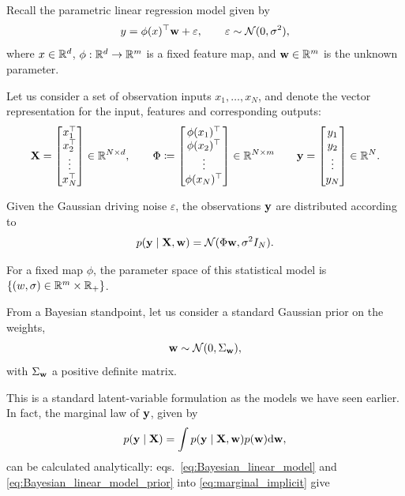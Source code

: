 Recall the parametric linear regression model given by
\[
y = \phi(x)^\top { \mathbf{w}} + \varepsilon,
\qquad
\varepsilon \sim {\mathcal N}(0,\sigma^2),
\]
where $x\in{\mathbb R}^d$, $\phi: {\mathbb R}^d \to{\mathbb R}^m$ is a fixed feature map, and ${ \mathbf{w}}\in{\mathbb R}^m$ is the unknown parameter. 

Let us consider a set of observation inputs $x_1,\ldots,x_N$, and denote the vector representation for the input, features and corresponding outputs: 
\[
{ \mathbf{X}}=\begin{bmatrix}
x_1^\top\\
x_2^\top\\
\vdots\\
x_N^\top
\end{bmatrix} \in{\mathbb R}^{N\times d},
\qquad
\Phi \coloneqq
\begin{bmatrix}
\phi(x_1)^\top\\
\phi(x_2)^\top\\
\vdots\\
\phi(x_N)^\top
\end{bmatrix}\in\mathbb{R}^{N\times m}
\qquad
{ \mathbf{y}}=\begin{bmatrix}
y_1\\
y_2\\
\vdots\\
y_N
\end{bmatrix} \in{\mathbb R}^{N}.
\]

Given the Gaussian driving noise $\varepsilon$, the observations ${ \mathbf{y}}$ are distributed according to 
\begin{equation}
    p({ \mathbf{y}}\mid { \mathbf{X}},{ \mathbf{w}}) = {\mathcal N}(\Phi{ \mathbf{w}},\sigma^2I_N).
    \label{eq:Bayesian_linear_model}
\end{equation}


\begin{remark}
    For a fixed map $\phi$, the parameter space of this statistical model is $\{(w,\sigma) \in{\mathbb R}^m\times{\mathbb R}_+\}$.
\end{remark}


From a Bayesian standpoint, let us consider a standard Gaussian prior on the weights,
\begin{equation}
{ \mathbf{w}} \sim \mathcal{N}(0,\Sigma_{ \mathbf{w}}),
 \label{eq:Bayesian_linear_model_prior}
\end{equation}
with $\Sigma_{ \mathbf{w}}$ a positive definite matrix.

This is a standard latent-variable formulation as the models we have seen earlier. In fact, the marginal law of ${ \mathbf{y}}$, given by 
\begin{equation}
    p({ \mathbf{y}} \mid { \mathbf{X}}) = \int  p({ \mathbf{y}} \mid { \mathbf{X}}, { \mathbf{w}})p({ \mathbf{w}}){\text{d}}{ \mathbf{w}},
    \label{eq:marginal_implicit}
\end{equation}
can be calculated analytically: eqs.~\eqref{eq:Bayesian_linear_model} and  \eqref{eq:Bayesian_linear_model_prior} into  \eqref{eq:marginal_implicit} give

